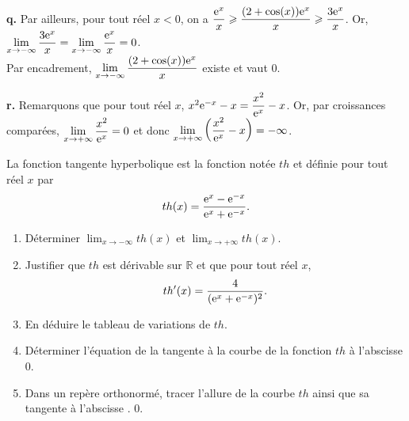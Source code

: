 \documentclass[11pt,fleqn, openany]{book} %
\begin{document}
\begin{solution}
\textbf{q.} Par ailleurs, pour tout réel $x<0$, on a $\dfrac{\mathrm{e}^x}{x} \geqslant \dfrac{(2+\cos(x))\mathrm{e}^x}{x}\geqslant \dfrac{3\mathrm{e}^x}{x}$. Or, $\displaystyle \lim_{x \to -\infty}\dfrac{3\mathrm{e}^x}{x}=\displaystyle \lim_{x \to -\infty}\dfrac{\mathrm{e}^x}{x}=0$. \\Par encadrement, $\displaystyle \lim_{x \to -\infty}\dfrac{(2+\cos(x))\mathrm{e}^x}{x}$ existe et vaut 0.

\textbf{r.}   Remarquons que pour tout réel $x$, $x^2\mathrm{e}^{-x}-x=\dfrac{x^2}{\mathrm{e}^x}-x$. Or, par croissances comparées, $\displaystyle \lim_{x\to+\infty} \dfrac{x^2}{\mathrm{e}^x}=0$ et donc $\displaystyle \lim_{x\to+\infty}\left(\dfrac{x^2}{\mathrm{e}^x}-x\right)=-\infty$.
\end{solution}






\begin{exercise}La fonction tangente hyperbolique est la fonction notée $th$ et définie pour tout réel $x$ par \[th(x)=\dfrac{\mathrm{e}^x-\mathrm{e}^{-x}}{\mathrm{e}^x+\mathrm{e}^{-x}}.\]
\begin{enumerate}
\item Déterminer $\displaystyle \lim_{x \to -\infty}th(x)$ et $\displaystyle \lim_{x \to +\infty} th(x)$.
\item Justifier que $th$ est dérivable sur $\mathbb{R}$ et que pour tout réel $x$,
\[th'(x)=\dfrac{4}{(\mathrm{e}^x+\mathrm{e}^{-x})^2}.\]
\item En déduire le tableau de variations de $th$.
\item Déterminer l'équation de la tangente à la courbe de la fonction $th$ à l'abscisse 0.
\item Dans un repère orthonormé, tracer l'allure de la courbe $th$ ainsi que sa tangente à l'abscisse .
0.\end{enumerate}\end{exercise}
\end{document}
